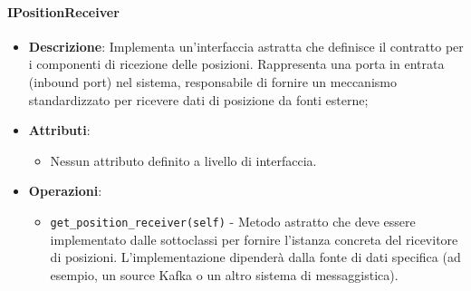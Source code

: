 \documentclass[10pt]{article}
\begin{document}
    \paragraph{IPositionReceiver}
    \begin{itemize} 
    \item \textbf{Descrizione}: Implementa un'interfaccia astratta che definisce il contratto per i componenti di ricezione delle posizioni. Rappresenta una porta in entrata (inbound port) nel sistema, responsabile di fornire un meccanismo standardizzato per ricevere dati di posizione da fonti esterne;
    \item \textbf{Attributi}:
    \begin{itemize}
        \item Nessun attributo definito a livello di interfaccia.
    \end{itemize}
    
    \item \textbf{Operazioni}:
    \begin{itemize}
        \item \texttt{get\_position\_receiver(self)} - Metodo astratto che deve essere implementato dalle sottoclassi per fornire l'istanza concreta del ricevitore di posizioni. L'implementazione dipenderà dalla fonte di dati specifica (ad esempio, un source Kafka o un altro sistema di messaggistica).
    \end{itemize}
    \end{itemize}
\end{document}
